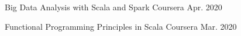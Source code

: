 

\begin{cventries}

  \cventry
    {} %
    {Big Data Analysis with Scala and Spark} %
    {Coursera} %
    {Apr. 2020} %
    {
      \begin{cvitems} %
        \item {}
      \end{cvitems}
    }

  \cventry
    {} %
    {Functional Programming Principles in Scala} %
    {Coursera} %
    {Mar. 2020} %
    {
      \begin{cvitems} %
        \item {}
      \end{cvitems}
    }

\end{cventries}
